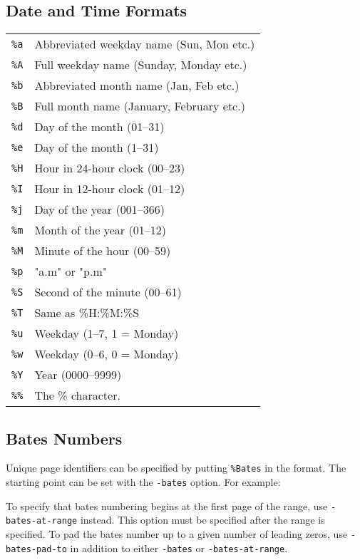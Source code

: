 \documentclass{book}
\begin{document}
  \subsection{Date and Time Formats}
  \begin{tabular}{ll}
    \texttt{\%a} & Abbreviated weekday name (Sun, Mon etc.)\\
    \texttt{\%A} & Full weekday name (Sunday, Monday etc.)\\
    \texttt{\%b} & Abbreviated month name (Jan, Feb etc.)\\
    \texttt{\%B} & Full month name (January, February etc.)\\
    \texttt{\%d} & Day of the month (01--31) \\
    \texttt{\%e} & Day of the month (1--31) \\
    \texttt{\%H} & Hour in 24-hour clock (00--23)\\
    \texttt{\%I} & Hour in 12-hour clock (01--12)\\
    \texttt{\%j} & Day of the year (001--366)\\
    \texttt{\%m} & Month of the year (01--12)\\
    \texttt{\%M} & Minute of the hour (00--59)\\
    \texttt{\%p} & "a.m" or "p.m"\\
    \texttt{\%S} & Second of the minute (00--61)\\
    \texttt{\%T} & Same as \%H:\%M:\%S\\
    \texttt{\%u} & Weekday (1--7, 1 = Monday)\\
    \texttt{\%w} & Weekday (0--6, 0 = Monday)\\
    \texttt{\%Y} & Year (0000--9999)\\
    \texttt{\%\%} & The \% character.
  \end{tabular}


  \subsection{Bates Numbers}
  Unique page identifiers can be specified by putting \verb!%Bates! in the format.
The starting point can be set with the \texttt{-bates} option. For example:
\noindent{}

To specify that bates numbering begins at the first page of the range, use \texttt{-bates-at-range} instead. This option must be specified after the range is specified. To pad the bates number up to a given number of leading zeros, use \texttt{-bates-pad-to} in addition to either \texttt{-bates} or \texttt{-bates-at-range}.
\end{document}
